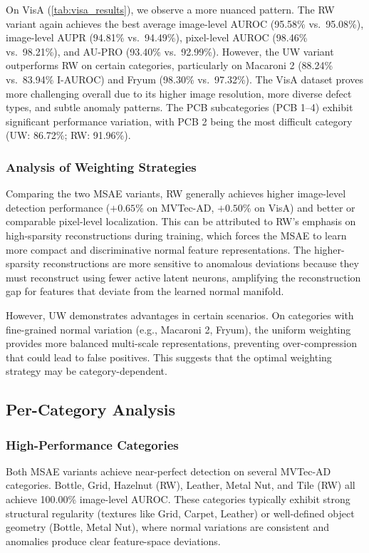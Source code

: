 On VisA (\cref{tab:visa_results}), we observe a more nuanced pattern.
The RW variant again achieves the best average image-level AUROC (95.58\% vs.\ 95.08\%), image-level AUPR (94.81\% vs.\ 94.49\%), pixel-level AUROC (98.46\% vs.\ 98.21\%), and AU-PRO (93.40\% vs.\ 92.99\%).
However, the UW variant outperforms RW on certain categories, particularly on Macaroni 2 (88.24\% vs.\ 83.94\% I-AUROC) and Fryum (98.30\% vs.\ 97.32\%).
The VisA dataset proves more challenging overall due to its higher image resolution, more diverse defect types, and subtle anomaly patterns.
The PCB subcategories (PCB 1--4) exhibit significant performance variation, with PCB 2 being the most difficult category (UW: 86.72\%; RW: 91.96\%).

\subsubsection{Analysis of Weighting Strategies}

Comparing the two MSAE variants, RW generally achieves higher image-level detection performance ($+0.65\%$ on MVTec-AD, $+0.50\%$ on VisA) and better or comparable pixel-level localization.
This can be attributed to RW's emphasis on high-sparsity reconstructions during training, which forces the MSAE to learn more compact and discriminative normal feature representations.
The higher-sparsity reconstructions are more sensitive to anomalous deviations because they must reconstruct using fewer active latent neurons, amplifying the reconstruction gap for features that deviate from the learned normal manifold.

However, UW demonstrates advantages in certain scenarios.
On categories with fine-grained normal variation (e.g., Macaroni 2, Fryum), the uniform weighting provides more balanced multi-scale representations, preventing over-compression that could lead to false positives.
This suggests that the optimal weighting strategy may be category-dependent.

\subsection{Per-Category Analysis}

\subsubsection{High-Performance Categories}

Both MSAE variants achieve near-perfect detection on several MVTec-AD categories.
Bottle, Grid, Hazelnut (RW), Leather, Metal Nut, and Tile (RW) all achieve 100.00\% image-level AUROC.
These categories typically exhibit strong structural regularity (textures like Grid, Carpet, Leather) or well-defined object geometry (Bottle, Metal Nut), where normal variations are consistent and anomalies produce clear feature-space deviations.


